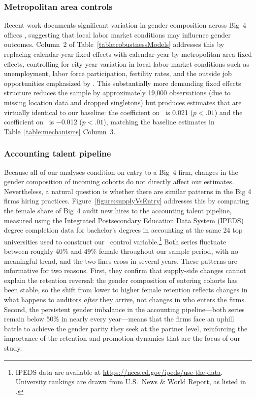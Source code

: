 \documentclass[11pt]{article}
\begin{document}
        \subsubsection{Metropolitan area controls}\label{section:locationControls}

            Recent work documents significant variation in gender composition across Big~4 offices \parencite{khavisDoesGenderComposition2025}, suggesting that local labor market conditions may influence gender outcomes. Column~2 of Table~\ref{table:robustnessModels} addresses this by replacing calendar-year fixed effects with calendar-year by metropolitan area fixed effects, controlling for city-year variation in local labor market conditions such as unemployment, labor force participation, fertility rates, and the outside job opportunities emphasized by \textcite{egeAuditorDistraction2024}. This substantially more demanding fixed effects structure reduces the sample by approximately 19,000 observations (due to missing location data and dropped singletons) but produces estimates that are virtually identical to our baseline: the coefficient on \FEMALExPOST\ is 0.021 ($p<.01$) and the coefficient on \FEMALE\ is $-$0.012 ($p<.01$), matching the baseline estimates in Table~\ref{table:mechanisms} Column~3.

        \subsubsection{Accounting talent pipeline}\label{section:pipeline}

            Because all of our analyses condition on entry to a Big~4 firm, changes in the gender composition of incoming cohorts do not directly affect our estimates. Nevertheless, a natural question is whether there are similar patterns in the Big 4 firms hiring practices. Figure~\ref{figure:supplyVsEntry} addresses this by comparing the female share of Big~4 audit new hires to the accounting talent pipeline, measured using the Integrated Postsecondary Education Data System (IPEDS) degree completion data for bachelor's degrees in accounting at the same 24 top universities used to construct our \TOPUNIVERSITY\ control variable.\footnote{IPEDS data are available at \url{https://nces.ed.gov/ipeds/use-the-data}. University rankings are drawn from U.S.\ News \& World Report, as listed in \textcite{FGH2022}.} Both series fluctuate between roughly 40\% and 49\% female throughout our sample period, with no meaningful trend, and the two lines cross in several years. These patterns are informative for two reasons. First, they confirm that supply-side changes cannot explain the retention reversal: the gender composition of entering cohorts has been stable, so the shift from lower to higher female retention reflects changes in what happens to auditors \textit{after} they arrive, not changes in who enters the firms. Second, the persistent gender imbalance in the accounting pipeline---both series remain below 50\% in nearly every year---means that the firms face an uphill battle to achieve the gender parity they seek at the partner level, reinforcing the importance of the retention and promotion dynamics that are the focus of our study.
\end{document}
